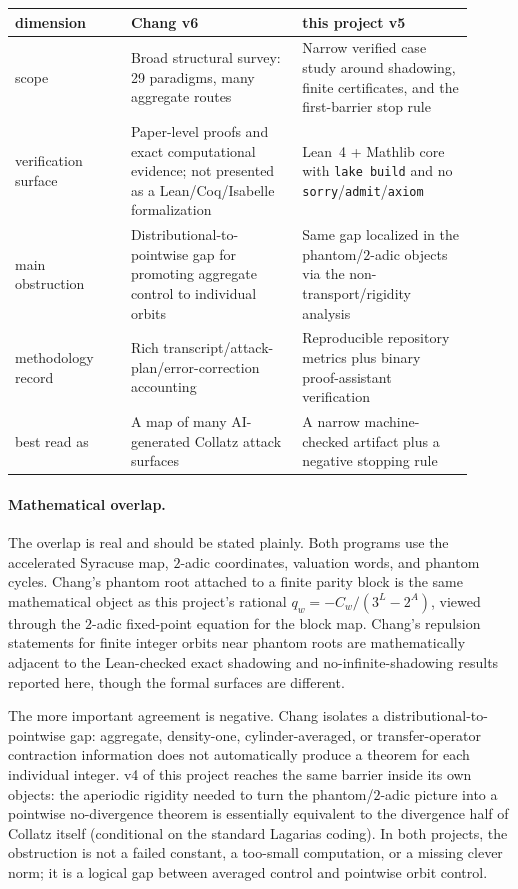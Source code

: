 \documentclass[11pt,a4paper]{article}
\theoremstyle{definition}
\begin{document}
\begin{center}
\small
\begin{tabular}{p{0.23\linewidth}p{0.34\linewidth}p{0.34\linewidth}}
\toprule
dimension & Chang v6 & this project v5 \\
\midrule
scope & Broad structural survey: 29 paradigms, many aggregate routes &
Narrow verified case study around shadowing, finite certificates, and the
first-barrier stop rule \\
verification surface & Paper-level proofs and exact computational evidence;
not presented as a Lean/Coq/Isabelle formalization &
Lean~4 + Mathlib core with \texttt{lake build} and no
\texttt{sorry}/\texttt{admit}/\texttt{axiom} \\
main obstruction & Distributional-to-pointwise gap for promoting aggregate
control to individual orbits &
Same gap localized in the phantom/$2$-adic objects via the
non-transport/rigidity analysis \\
methodology record & Rich transcript/attack-plan/error-correction accounting &
Reproducible repository metrics plus binary proof-assistant verification \\
best read as & A map of many AI-generated Collatz attack surfaces &
A narrow machine-checked artifact plus a negative stopping rule \\
\bottomrule
\end{tabular}
\end{center}

\paragraph{Mathematical overlap.}
The overlap is real and should be stated plainly. Both programs use the
accelerated Syracuse map, $2$-adic coordinates, valuation words, and
phantom cycles. Chang's phantom root attached to a finite parity block is
the same mathematical object as this project's rational
$q_w=-C_w/(3^L-2^A)$, viewed through the $2$-adic fixed-point equation for
the block map. Chang's repulsion statements for finite integer orbits near
phantom roots are mathematically adjacent to the Lean-checked exact
shadowing and no-infinite-shadowing results reported here, though the
formal surfaces are different.

The more important agreement is negative. Chang isolates a
distributional-to-pointwise gap: aggregate, density-one, cylinder-averaged,
or transfer-operator contraction information does not automatically produce
a theorem for each individual integer. v4 of this project reaches the same
barrier inside its own objects: the aperiodic rigidity needed to turn the
phantom/$2$-adic picture into a pointwise no-divergence theorem is
essentially equivalent to the divergence half of Collatz itself (conditional
on the standard Lagarias coding). In both projects, the obstruction is not a
failed constant, a too-small computation, or a missing clever norm; it is a
logical gap between averaged control and pointwise orbit control.
\end{document}
